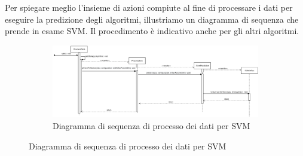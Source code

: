 Per spiegare meglio l'insieme di azioni compiute al fine di processare i dati per eseguire la predizione degli algoritmi, illustriamo un diagramma di sequenza che prende in esame SVM\glo. Il procedimento è indicativo anche per gli altri algoritmi.
\mbox{}
\begin{landscape}
	\begin{figure}
		\begin{figure} [H]
			\includegraphics[width=\linewidth]{./img/Diagrammi/ds-plug-in.png}
			\caption{Diagramma di sequenza di processo dei dati per SVM}
		\end{figure}
	\end{figure}
\end{landscape}
